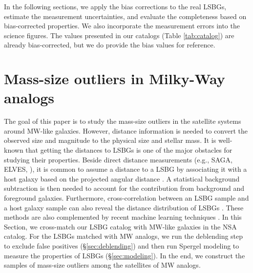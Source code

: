 \documentclass[twocolumn,astrosymb,twocolappendix]{aastex631}
\begin{document}
\begin{CJK*}{UTF8}{gbsn}
In the following sections, we apply the bias corrections to the real LSBGs, estimate the measurement uncertainties, and evaluate the completeness based on bias-corrected properties. We also incorporate the measurement errors into the science figures. The values presented in our catalogs (Table \ref{tab:catalog}) are already bias-corrected, but we do provide the bias values for reference. 



\section{Mass-size outliers in Milky-Way analogs}\label{sec:sample_construction}
The goal of this paper is to study the mass-size outliers in the satellite systems around MW-like galaxies. However, distance information is needed to convert the observed size and magnitude to the physical size and stellar mass. It is well-known that getting the distances to LSBGs is one of the major obstacles for studying their properties. Beside direct distance measurements (e.g., SAGA, ELVES, \citealt{Kadowaki2021}), it is common to assume a distance to a LSBG by associating it with a host galaxy based on the projected angular distance \citep[e.g.,][]{vanDokkum2015,vdBurg2016,Wang2021,Zaritsky2022,Nashimoto2022}. A statistical background subtraction is then needed to account for the contribution from background and foreground galaxies. Furthermore, cross-correlation between an LSBG sample and a host galaxy sample can also reveal the distance distribution of LSBGs \citep{Greene2022}. These methods are also complemented by recent machine learning techniques \citep{Baxter2021,xSAGA-I}. In this Section, we cross-match our LSBG catalog with MW-like galaxies in the NSA catalog. For the LSBGs matched with MW analogs, we run the deblending step to exclude false positives (\S\ref{sec:deblending}) and then run Spergel modeling to measure the properties of LSBGs (\S\ref{sec:modeling}). In the end, we construct the samples of mass-size outliers among the satellites of MW analogs. 


\end{CJK*}
\end{document}
